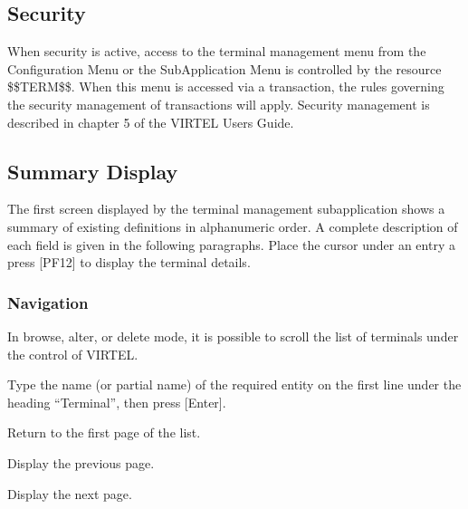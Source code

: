 \documentclass[letterpaper,10pt,english]{sphinxmanual}
\begin{document}
\subsection{Security}
\label{\detokenize{connectivity_guide:index-96}}\label{\detokenize{connectivity_guide:id49}}
\sphinxAtStartPar
When security is active, access to the terminal management menu from the Configuration Menu or the Sub\sphinxhyphen{}Application Menu is controlled by the resource \$\$TERM\$\$. When this menu is accessed via a transaction, the rules governing the security management of transactions will apply. Security management is described in chapter 5 of the VIRTEL Users Guide.

\ignorespaces 

\subsection{Summary Display}
\label{\detokenize{connectivity_guide:index-97}}\label{\detokenize{connectivity_guide:id50}}
\sphinxAtStartPar
The first screen displayed by the terminal management sub\sphinxhyphen{}application shows a summary of existing definitions in alphanumeric order. A complete description of each field is given in the following paragraphs. Place the cursor under an entry a press {[}PF12{]} to display the terminal details.

\sphinxAtStartPar
{}

\ignorespaces 

\subsubsection{Navigation}
\label{\detokenize{connectivity_guide:index-98}}\label{\detokenize{connectivity_guide:id51}}
\sphinxAtStartPar
In browse, alter, or delete mode, it is possible to scroll the list of terminals under the control of VIRTEL.
\begin{description}
\sphinxAtStartPar
Type the name (or partial name) of the required entity on the first line under the heading “Terminal”, then press {[}Enter{]}.

\sphinxlineitem{{[}PF6{]}}
\sphinxAtStartPar
Return to the first page of the list.

\sphinxlineitem{{[}PF7{]}}
\sphinxAtStartPar
Display the previous page.

\sphinxlineitem{{[}PF8{]}}
\sphinxAtStartPar
Display the next page.

\end{description}
\end{document}
